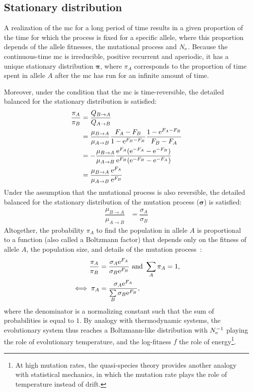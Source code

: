 \subsection{Stationary distribution}

A realization of the \gls{mc} for a long period of time results in a given proportion of the time for which the process is fixed for a specific \gls{allele}, where this proportion depends of the \gls{allele} fitnesses, the mutational process and $N_{\textrm{e}}$.
Because the continuous-time \gls{mc} is irreducible, positive recurrent and aperiodic, it has a unique stationary distribution $\bm{\pi}$, where $\pi_{A}$ corresponds to the proportion of time spent in \gls{allele} $A$ after the \gls{mc} has run for an infinite amount of time.

Moreover, under the condition that the \gls{mc} is time-reversible, the detailed balanced for the stationary distribution is satisfied:
\begin{align}
    \dfrac{\pi_{A}}{\pi_{B}} & = \dfrac{Q_{B \to A}}{Q_{A \to B}} \\
    & = \dfrac{\mu_{B \to A}}{\mu_{A \to B}}  \dfrac{F_{A}-F_{B}}{ 1 - \mathrm{e}^{F_{B}-F_{B}}}  \dfrac{1 - \mathrm{e}^{F_{A} - F_{B}} }{F_{B} - F_{A}}\\
    & = - \dfrac{\mu_{B \to A}}{\mu_{A \to B}}  \dfrac{ \mathrm{e}^{F_{A}}(\mathrm{e}^{-F_{A}} - \mathrm{e}^{- F_{B}}) }{ \mathrm{e}^{F_{B}}(\mathrm{e}^{-F_{B}} - \mathrm{e}^{- F_{A}})}  \\
    & = \dfrac{\mu_{B \to A}}{\mu_{A \to B}} \dfrac{\mathrm{e}^{F_{A}}}{\mathrm{e}^{F_{B}}} \\
\end{align}
Under the assumption that the mutational process is also reversible, the detailed balanced for the stationary distribution of the mutation process ($\bm{\sigma}$) is satisfied:
\begin{align}
    \dfrac{\mu_{B \to A}}{\mu_{A \to B}} & = \dfrac{\sigma_{A}}{\sigma_{B}}
\end{align}
Altogether, the probability $\pi_{A}$ to find the population in \gls{allele} $A$ is proportional to a function (also called a Boltzmann factor) that depends only on the fitness of \gls{allele} $A$, the population size, and details of the mutation process~\citep{Sella2005,Mustonen2005}:
\begin{align}
    \dfrac{\pi_{A}}{\pi_{B}} & = \dfrac{\sigma_{A}\mathrm{e}^{F_{A}}}{\sigma_{B}\mathrm{e}^{F_{B}}} \text{ and } \sum\limits_{A}\pi_{A} = 1, \\
    \iff \pi_{A} & = \dfrac{\sigma_{A}\mathrm{e}^{F_{A}}}{\sum\limits_{B} \sigma_{B}\mathrm{e}^{F_{B}} }, \label{eq:equilibrium-mut-sel}
\end{align}
where the denominator is a normalizing constant such that the sum of probabilities is equal to $1$.
By analogy with thermodynamic systems, the evolutionary system thus reaches a Boltzmann-like distribution with $N_{\textrm{e}}^{-1}$ playing the role of evolutionary temperature, and the log-fitness $f$ the role of energy\footnote{At high mutation rates, the quasi-species theory provides another analogy with statistical mechanics, in which the mutation rate plays the role of temperature instead of \gls{drift}.}.

